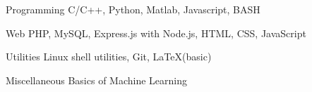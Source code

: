 \begin{cvskills}

  \cvskill
  {Programming}
  {C/C++, Python, Matlab, Javascript, BASH}

  \cvskill
  {Web}
  {PHP, MySQL, Express.js with Node.js, HTML, CSS, JavaScript}

  \cvskill
  {Utilities}
  {Linux shell utilities, Git, \LaTeX(basic) }

  \cvskill
  {Miscellaneous}
  {Basics of Machine Learning}

\end{cvskills}

